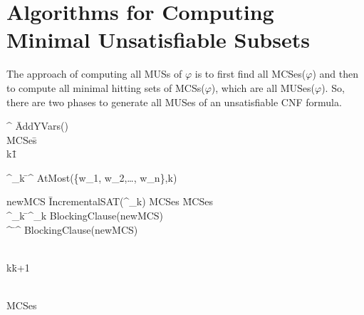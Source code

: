 \section{Algorithms for Computing Minimal Unsatisfiable Subsets}
\label{sec:algorithms for computing minimal unsatisfiable subset}
The approach of computing all MUSs of $\varphi$ is to first find all MCSes($\varphi$) and then to compute all minimal hitting sets of MCSs($\varphi$), which are all MUSes($\varphi$). So, there are two phases to generate all MUSes of an unsatisfiable CNF formula.\begin{Algorithm}
	\caption{Algorithm for finding all MCSes of a formula $\varphi$}
	\label{alg:findmcses}
	\begin{algorithm}{}{\text{$\varphi$}}
		\varphi^{\prime} \= AddYVars(\varphi) \\
		MCSes\=\emptyset \\
		k\=1 \\
		\begin{WHILE}{}
			\varphi^{\prime}_{k} \= \varphi^{\prime} \wedge AtMost(\{\neg w_{1}, \neg w_{2},\ldots, \neg w_{n}\},k) \\
			\begin{WHILE}{newMCS \= IncrementalSAT(\varphi^{\prime}_{k})}
				MCSes \= MCSes  \\
				\varphi^{\prime}_{k} \= \varphi^{\prime}_{k} \wedge BlockingClause(newMCS) \\
				\varphi^{\prime} \= \varphi^{\prime} \wedge BlockingClause(newMCS) \\
			\end{WHILE} \\
			k\=k+1 \\
		\end{WHILE} \\
		\RETURN MCSes
	\end{algorithm}
\end{Algorithm}
